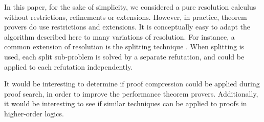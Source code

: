 In this paper, for the sake of simplicity, we considered a pure resolution calculus without restrictions, refinements or extensions. However, in practice, theorem provers do use restrictions and extensions. It is conceptually easy to adapt the algorithm described here to many variations of resolution. 
For instance, a common extension of resolution is the splitting technique \cite{WeidenbachSplitting}. When splitting is used, each split sub-problem is solved by a separate refutation, and {\FORPI} could be applied to each refutation independently. 

It would be interesting to determine if proof compression could be applied during proof search, in order to improve the performance theorem provers. Additionally, it would be interesting to see if similar techniques can be applied to proofs in higher-order logics.








